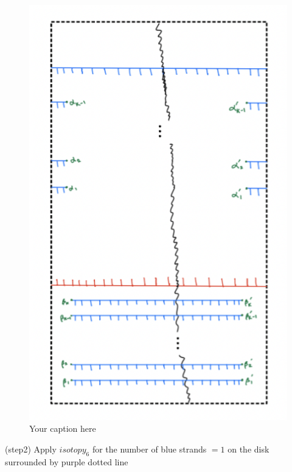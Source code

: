 \begin{figure}[H] %
    \centering
    \includegraphics[scale = 0.95]{diagrams/definition6/4.png} %
    \caption{Your caption here}
    \label{fig:your-label}
\end{figure}

(step2) Apply $isotopy_6$ for the number of blue strands $=1$ on the disk surrounded by purple dotted line

